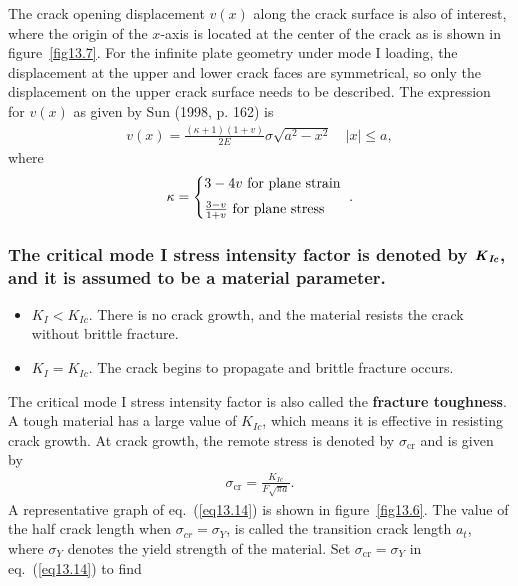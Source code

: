 \documentclass{AeroStructure-ERJohnson}
\begin{document}
The crack opening displacement $v(x)$ along the crack surface is also of interest, where the origin of the $x$-axis is located at the center of the crack as is shown in figure~\ref{fig13.7}. For the infinite plate geometry under mode I loading, the displacement at the upper and lower crack faces are symmetrical, so only the displacement on the upper crack surface needs to be described. The expression for $v(x)$ as given by Sun (1998, p. 162) is
\begin{align}\label{eq13.12}
v(x)=\frac{(\kappa+1)(1+v)}{2 E} \sigma \sqrt{a^{2}-x^{2}} \quad|x| \leq a,
\end{align}
where
\begin{align}\label{eq13.13}
\kappa=\left\{\begin{array}{@{}l@{}}3-4 v \text { for plane strain } \\[6pt]
\frac{3-v}{1+v} \text { for plane stress }\end{array}\right..
\end{align}

\subsubsection{The critical mode I stress intensity factor is denoted by $\textbf{\textit{K}}_{\textbf{\textit{Ic}}}$, and it is assumed to be a material parameter.}
\begin{itemize}
\item $K_{I}<K_{I c}$. There is no crack growth, and the material resists the crack without brittle fracture.
\item $K_{I}=K_{I c}$. The crack begins to propagate and brittle fracture occurs.
\end{itemize}
The critical mode I stress intensity factor is also called the \textbf{fracture toughness}. A tough material has a large value of $K_{I c}$, which means it is effective in resisting crack growth. At crack growth, the remote stress is denoted by $\sigma_{\mathrm{cr}}$ and is given by
\begin{align}\label{eq13.14}
\sigma_{\mathrm{cr}}=\frac{K_{I c}}{F \sqrt{\pi a}}.
\end{align}
A representative graph of eq.~(\ref{eq13.14}) is shown in figure~\ref{fig13.6}. The value of the half crack length when $\sigma_{c r}=\sigma_{Y}$, is called the transition crack length $a_{t}$, where $\sigma_{Y}$ denotes the yield strength of the material. Set $\sigma_{\mathrm{cr}}=\sigma_{Y}$\vadjust{\vspace*{6pt}\pagebreak} in eq.~(\ref{eq13.14}) to\vspace*{-10pt} find
\end{document}
